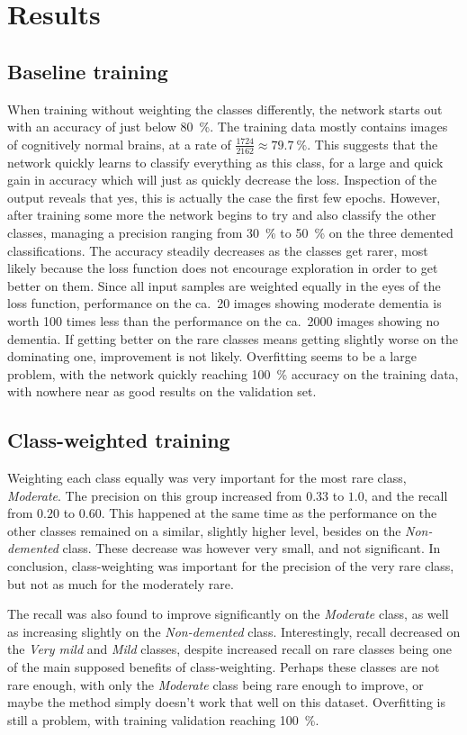 \documentclass{kththesis}
\newcommand{\num}[1]{{#1}}
\begin{document}
\section{Results}
\subsection{Baseline training}
When training without weighting the classes differently, the network starts out with an accuracy of just below 80~\%. The training data mostly contains images of cognitively normal brains, at a rate of $\frac{1724}{2162} \approx 79.7~\%$. This suggests that the network quickly learns to classify everything as this class, for a large and quick gain in accuracy which will just as quickly decrease the loss. Inspection of the output reveals that yes, this is actually the case the first few epochs. However, after training some more the network begins to try and also classify the other classes, managing a precision ranging from 30~\% to 50~\% on the three demented classifications. The accuracy steadily decreases as the classes get rarer, most likely because the loss function does not encourage exploration in order to get better on them. Since all input samples are weighted equally in the eyes of the loss function, performance on the ca.\ 20 images showing moderate dementia is worth 100 times less than the performance on the ca.\ \num{2000} images showing no dementia. If getting better on the rare classes means getting slightly worse on the dominating one, improvement is not likely. Overfitting seems to be a large problem, with the network quickly reaching 100~\% accuracy on the training data, with nowhere near as good results on the validation set.

\subsection{Class-weighted training}
Weighting each class equally was very important for the most rare class, \textit{Moderate}. The precision on this group increased from $0.33$ to $1.0$, and the recall from $0.20$ to $0.60$. This happened at the same time as the performance on the other classes remained on a similar, slightly higher level, besides on the \textit{Non-demented} class. These decrease was however very small, and not significant. In conclusion, class-weighting was important for the precision of the very rare class, but not as much for the moderately rare.

The recall was also found to improve significantly on the \textit{Moderate} class, as well as increasing slightly on the \textit{Non-demented} class. Interestingly, recall decreased on the \textit{Very mild} and \textit{Mild} classes, despite increased recall on rare classes being one of the main supposed benefits of class-weighting. Perhaps these classes are not rare enough, with only the \textit{Moderate} class being rare enough to improve, or maybe the method simply doesn't work that well on this dataset. Overfitting is still a problem, with training validation reaching 100~\%.
\end{document}
